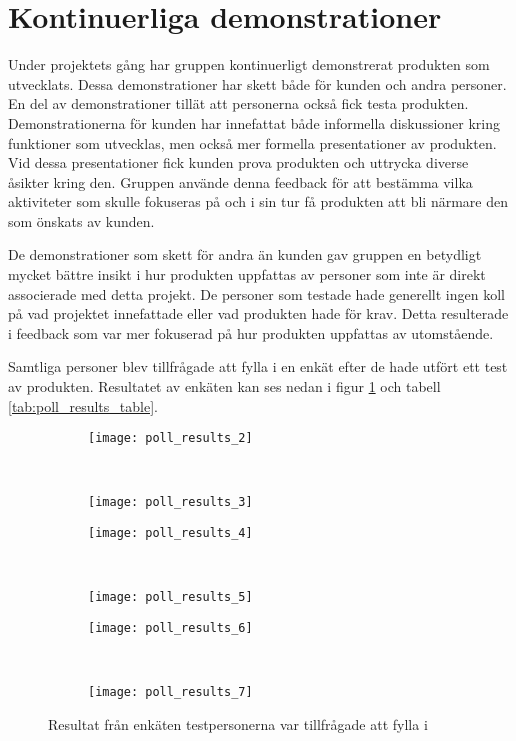 \section{Kontinuerliga demonstrationer}

Under projektets gång har gruppen kontinuerligt demonstrerat produkten som utvecklats. Dessa demonstrationer har skett både för kunden och andra personer. En del av demonstrationer tillät att personerna också fick testa produkten. Demonstrationerna för kunden har innefattat både informella diskussioner kring funktioner som utvecklas, men också mer formella presentationer av produkten. Vid dessa presentationer fick kunden prova produkten och uttrycka diverse åsikter kring den. Gruppen använde denna feedback för att bestämma vilka aktiviteter som skulle fokuseras på och i sin tur få produkten att bli närmare den som önskats av kunden. 

De demonstrationer som skett för andra än kunden gav gruppen en betydligt mycket bättre insikt i hur produkten uppfattas av personer som inte är direkt associerade med detta projekt. De personer som testade hade generellt ingen koll på vad projektet innefattade eller vad produkten hade för krav. Detta resulterade i feedback som var mer fokuserad på hur produkten uppfattas av utomstående. 

Samtliga personer blev tillfrågade att fylla i en enkät efter de hade utfört ett test av produkten. Resultatet av enkäten kan ses nedan i figur \ref{fig:poll_results} och tabell \ref{tab:poll_results_table}.


\begin{figure}
    \centering
    \begin{subfigure}[]{0.5\textwidth}
        \centering
        \texttt{[image: poll\_results\_2]}
        \caption{}        
    \end{subfigure}%
    ~
    \begin{subfigure}[]{0.5\textwidth}
        \centering
        \texttt{[image: poll\_results\_3]}
        \caption{}        
    \end{subfigure}

    \begin{subfigure}[]{0.5\textwidth}
        \centering
        \texttt{[image: poll\_results\_4]}
        \caption{}        
    \end{subfigure}%
    ~
    \begin{subfigure}[]{0.5\textwidth}
        \centering
        \texttt{[image: poll\_results\_5]}
        \caption{}        
    \end{subfigure}

    \begin{subfigure}[]{0.5\textwidth}
        \centering
        \texttt{[image: poll\_results\_6]}
        \caption{}        
    \end{subfigure}%
    ~
    \begin{subfigure}[]{0.5\textwidth}
        \centering
        \texttt{[image: poll\_results\_7]}
        \caption{}    
    \end{subfigure}
    \caption{Resultat från enkäten testpersonerna var tillfrågade att fylla i}
    \label{fig:poll_results}
\end{figure}

